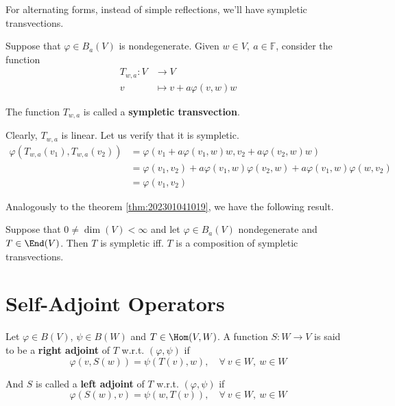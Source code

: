 For alternating forms, instead of simple reflections, we'll have sympletic transvections. 

\begin{definition}
  Suppose that $\varphi \in B_a(V)$ is nondegenerate. Given $w \in V, ~a \in \mathbb{F}$, consider the function 
  \begin{equation*}
    \begin{aligned}
      T_{w,a} : V &\longrightarrow V \\
      v &\longmapsto v + a \varphi(v,w) w
    \end{aligned}
  \end{equation*}
  
  The function $T_{w,a}$ is called a \textbf{sympletic transvection}.
\end{definition}

Clearly, $T_{w,a}$ is linear. Let us verify that it is sympletic. 
\begin{equation*}
  \begin{aligned}
    \varphi(T_{w,a}(v_1), T_{w,a}(v_2)) &= \varphi(v_1 + a \varphi(v_1, w) w, v_2 + a \varphi(v_2, w) w) \\
    &= \varphi(v_1, v_2) + a \varphi(v_1, w) \varphi(v_2, w) + a \varphi(v_1, w) \varphi(w, v_2) \\
    &= \varphi(v_1, v_2)
  \end{aligned}
\end{equation*}

Analogously to the theorem \ref{thm:202301041019}, we have the following result.

\begin{theorem}
  Suppose that $0 \neq \dim(V) < \infty$ and let $\varphi \in B_a(V)$ nondegenerate and $T \in \End(V)$. Then $T$ is sympletic iff. $T$ is a composition of sympletic transvections.
\end{theorem}

\section{Self-Adjoint Operators}

\begin{definition}[Adjoint]
  Let $\varphi \in B(V)$, $\psi \in B(W)$ and $T \in \Hom(V,W)$. A function $S : W \longrightarrow V$ is said to be a \textbf{right adjoint} of $T$ w.r.t. $(\varphi, \psi)$ if 
  \[
    \varphi(v, S(w)) = \psi(T(v), w), \quad \forall~ v\in W, ~w \in W
  \]

  And $S$ is called a \textbf{left adjoint} of $T$ w.r.t. $(\varphi, \psi)$ if 
  \[
    \varphi(S(w), v) = \psi(w, T(v)), \quad \forall~ v\in W, ~w \in W
  \]
\end{definition}

